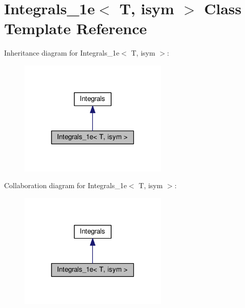 \hypertarget{classIntegrals__1e}{}\section{Integrals\+\_\+1e$<$ T, isym $>$ Class Template Reference}
\label{classIntegrals__1e}


Inheritance diagram for Integrals\+\_\+1e$<$ T, isym $>$\+:\nopagebreak
\begin{figure}[H]
\begin{center}
\leavevmode
\includegraphics[width=201pt]{classIntegrals__1e__inherit__graph}
\end{center}
\end{figure}


Collaboration diagram for Integrals\+\_\+1e$<$ T, isym $>$\+:\nopagebreak
\begin{figure}[H]
\begin{center}
\leavevmode
\includegraphics[width=201pt]{classIntegrals__1e__coll__graph}
\end{center}
\end{figure}
